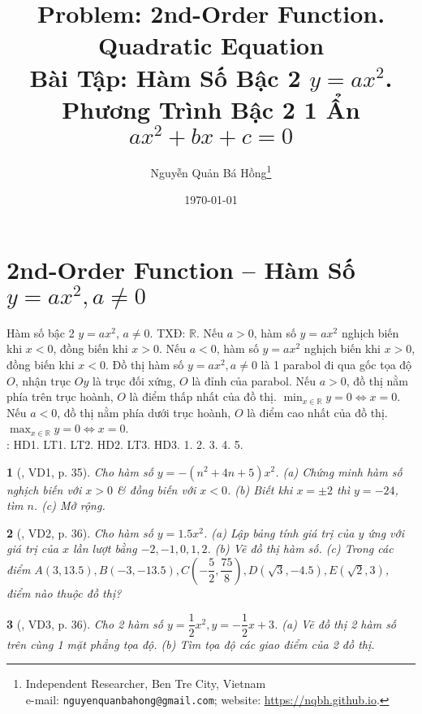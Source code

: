\documentclass{article}
\title{Problem: 2nd-Order Function. Quadratic Equation\\Bài Tập: Hàm Số Bậc 2 $y = ax^2$. Phương Trình Bậc 2 1 Ẩn $ax^2 + bx + c = 0$}
\author{Nguyễn Quản Bá Hồng\footnote{Independent Researcher, Ben Tre City, Vietnam\\e-mail: \texttt{nguyenquanbahong@gmail.com}; website: \url{https://nqbh.github.io}.}}
\date{\today}
\newtheorem{baitoan}{}
\begin{document}
\maketitle
\tableofcontents


\section{2nd-Order Function -- Hàm Số $y = ax^2,a\ne0$}
 Hàm số bậc 2 $y = ax^2$, $a\ne0$. TXĐ: $\mathbb{R}$. Nếu $a > 0$, hàm số $y = ax^2$ nghịch biến khi $x < 0$, đồng biến khi $x > 0$. Nếu $a < 0$, hàm số $y = ax^2$ nghịch biến khi $x > 0$, đồng biến khi $x < 0$.  Đồ thị hàm số $y = ax^2,a\ne0$ là 1 parabol đi qua gốc tọa độ $O$, nhận trục $Oy$ là trục đối xứng, $O$ là đỉnh của parabol. Nếu $a > 0$, đồ thị nằm phía trên trục hoành, $O$ là điểm thấp nhất của đồ thị. $\min_{x\in\mathbb{R}} y = 0\Leftrightarrow x = 0$. Nếu $a < 0$, đồ thị nằm phía dưới trục hoành, $O$ là điểm cao nhất của đồ thị. $\max_{x\in\mathbb{R}} y = 0\Leftrightarrow x = 0$.\\

\noindent\cite[Chap. VII, \S1, pp. 46--51]{SGK_Toan_9_Canh_Dieu_tap_2}: HD1. LT1. LT2. HD2. LT3. HD3. 1. 2. 3. 4. 5.

\begin{baitoan}[\cite{Binh_boi_duong_Toan_9_tap_2}, VD1, p. 35]
	Cho hàm số $y = -(n^2 + 4n + 5)x^2$. (a) Chứng minh hàm số nghịch biến với $x > 0$ \& đồng biến với $x < 0$. (b) Biết khi $x = \pm2$ thì $y = -24$, tìm $n$. (c) Mở rộng.
\end{baitoan}

\begin{baitoan}[\cite{Binh_boi_duong_Toan_9_tap_2}, VD2, p. 36]
	Cho hàm số $y = 1.5x^2$. (a) Lập bảng tính giá trị của $y$ ứng với giá trị của $x$ lần lượt bằng $-2,-1,0,1,2$. (b) Vẽ đồ thị hàm số. (c) Trong các điểm $A(3,13.5),B(-3,-13.5),C\left(-\dfrac{5}{2},\dfrac{75}{8}\right),D(\sqrt{3},-4.5),E(\sqrt{2},3)$, điểm nào thuộc đồ thị?
\end{baitoan}

\begin{baitoan}[\cite{Binh_boi_duong_Toan_9_tap_2}, VD3, p. 36]
	Cho 2 hàm số $y = \dfrac{1}{2}x^2,y = -\dfrac{1}{2}x + 3$. (a) Vẽ đồ thị 2 hàm số trên cùng 1 mặt phẳng tọa độ. (b) Tìm tọa độ các giao điểm của 2 đồ thị.
\end{baitoan}
\end{document}
